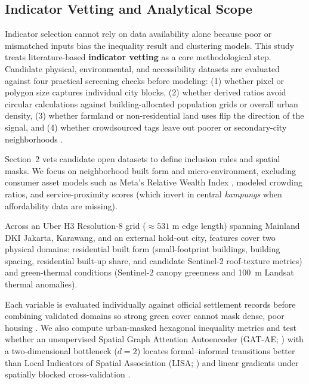 \subsection{Indicator Vetting and Analytical Scope}
Indicator selection cannot rely on data availability alone because poor or mismatched inputs bias the inequality result and clustering models. This study treats literature-based \textbf{indicator vetting} as a core methodological step. Candidate physical, environmental, and accessibility datasets are evaluated against four practical screening checks before modeling: (1) whether pixel or polygon size captures individual city blocks, (2) whether derived ratios avoid circular calculations against building-allocated population grids or overall urban density, (3) whether farmland or non-residential land uses flip the direction of the signal, and (4) whether crowdsourced tags leave out poorer or secondary-city neighborhoods \citep{BarringtonLeigh2017, Herfort2023, Schiavina2023}.

Section~2 vets candidate open datasets to define inclusion rules and spatial masks. We focus on neighborhood built form and micro-environment, excluding consumer asset models such as Meta's Relative Wealth Index \citep{Chi2022}, modeled crowding ratios, and service-proximity scores (which invert in central \textit{kampungs} when affordability data are missing).

Across an Uber H3 Resolution-8 grid ($\approx 531\text{ m}$ edge length) spanning Mainland DKI Jakarta, Karawang, and an external hold-out city, features cover two physical domains: residential built form (small-footprint buildings, building spacing, residential built-up share, and candidate Sentinel-2 roof-texture metrics) and green-thermal conditions (Sentinel-2 canopy greenness and 100~m Landsat thermal anomalies).

Each variable is evaluated individually against official settlement records before combining validated domains so strong green cover cannot mask dense, poor housing \citep{Mazziotta2016, OECD2008}. We also compute urban-masked hexagonal inequality metrics and test whether an unsupervised Spatial Graph Attention Autoencoder (GAT-AE; \citealt{Salehi2020, Velickovic2018}) with a two-dimensional bottleneck ($d=2$) locates formal--informal transitions better than Local Indicators of Spatial Association (LISA; \citealt{Anselin1995}) and linear gradients under spatially blocked cross-validation \citep{Roberts2017}.

